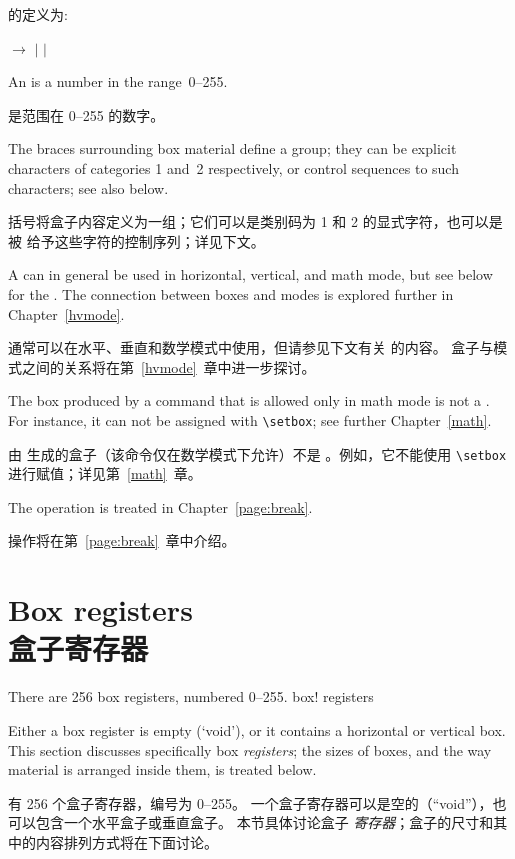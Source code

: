  的定义为:
\begin{disp} $\longrightarrow$ 
\nl\indent$|$   
          $|$  
\end{disp}
An  is a number in the range~0--255.

 是范围在 0--255 的数字。

The braces surrounding box material define a group;
they can be explicit characters
of categories 1 and~2 respectively,
or control sequences  to such characters;
see also below.

括号将盒子内容定义为一组；它们可以是类别码为 1 和 2 的显式字符，也可以是被  给予这些字符的控制序列；详见下文。


A  can in general be used in horizontal, vertical,
and math mode, but see below for the .
The connection between
boxes and modes is explored further in Chapter~\ref{hvmode}.

 通常可以在水平、垂直和数学模式中使用，但请参见下文有关  的内容。
盒子与模式之间的关系将在第~\ref{hvmode}~章中进一步探讨。


The box produced by  \ldash a command that is allowed only in
math mode \rdash  is not a . For instance,
it can not be assigned with \verb=\setbox=; see further
Chapter~\ref{math}.

由  生成的盒子（该命令仅在数学模式下允许）不是 。例如，它不能使用 \verb=\setbox= 进行赋值；详见第~\ref{math}~章。


The  operation is treated in Chapter~\ref{page:break}.

 操作将在第~\ref{page:break}~章中介绍。


\section{Box registers\\盒子寄存器}

There are 256 box registers, numbered 0--255. 
\term box! registers\par
Either a box register is  empty (`void'), or it contains a horizontal
or vertical box.
This section discusses specifically box {\em registers};
the sizes of boxes, and the way material is arranged inside them,
is treated below.
\awp

有 256 个盒子寄存器，编号为 0--255。
一个盒子寄存器可以是空的（“void”），也可以包含一个水平盒子或垂直盒子。
本节具体讨论盒子 {\em 寄存器}；盒子的尺寸和其中的内容排列方式将在下面讨论。


